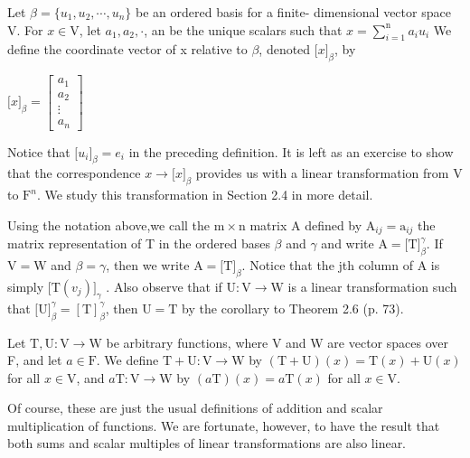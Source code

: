 \newpage
\begin{defn}
$ $\\ Let $\beta = \{ u_1,u_2,\cdots,u_n \}$ be an ordered basis for a finite- dimensional vector space V. For $x \in \mathrm{V}$, let $a_1, a_2, \cdot $, an be the unique scalars such that
$x = \sum_{i=1}^{\mathrm{n}} a_iu_i$
We define the coordinate vector of x relative to $\beta$, denoted $\lbrack x \rbrack_\beta$, by
\begin{center}
	 $\lbrack x \rbrack_\beta = \left[\begin{matrix}
	a_1 \\
	a_2 \\
	\vdots \\
	a_n 	
\end{matrix}\right]$
\end{center}

Notice that $\lbrack u_i \rbrack_\beta = e_i$ in the preceding definition. It is left as an exercise to show that the correspondence $x \rightarrow \lbrack x \rbrack_ \beta$ provides us with a linear transformation from V to $\mathrm{F}^n$. We study this transformation in Section 2.4 in more detail.
\end{defn}


\begin{defn} $ $\\
Using the notation above,we call the $\mathrm{m} \times \mathrm{n}$ matrix A defined by $\mathrm{A}_{ij} = \mathrm{a}_{ij}$ the matrix representation of T in the ordered bases $\beta$ and $\gamma$ and write $\mathrm{A} = \lbrack \mathrm{T} \rbrack^\gamma_\beta$. If $\mathrm{V} = \mathrm{W}$ and $\beta = \gamma$, then we write $\mathrm{A} = \lbrack \mathrm{T}\rbrack_\beta$.
Notice that the jth column of A is simply $\lbrack \mathrm{T} (v_j)\rbrack_\gamma$ . Also observe that if
$\mathrm{U} : \mathrm{V} \rightarrow \mathrm{W}$ is a linear transformation such that $\lbrack \mathrm{U} \rbrack^\gamma_\beta = [\mathrm{T}]^\gamma_\beta$, then $\mathrm{U} = \mathrm{T}$ by the corollary to Theorem 2.6 (p. 73).

\end{defn}

\begin{defn} $ $\\
Let $\mathrm{T} , \mathrm{U}: \mathrm{V} \rightarrow \mathrm{W}$ be arbitrary functions, where V and W are vector spaces over F, and let $a \in \mathrm{F}$. We define $\mathrm{T}+\mathrm{U} : \mathrm{V} \rightarrow \mathrm{W}$ by $(\mathrm{T}+\mathrm{U})(x) = \mathrm{T}(x)+\mathrm{U}(x)$ for all $x \in \mathrm{V}$, and $a\mathrm{T}: \mathrm{V} \rightarrow \mathrm{W}$ by $(a\mathrm{T})(x) = a\mathrm{T}(x)$ for all $x \in \mathrm{V}$.


Of course, these are just the usual definitions of addition and scalar multiplication of functions. We are fortunate, however, to have the result that both sums and scalar multiples of linear transformations are also linear.
\end{defn}

	

		
